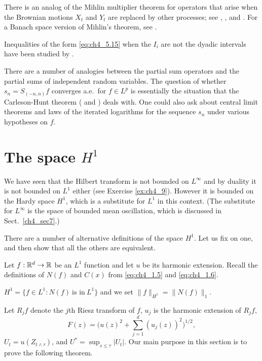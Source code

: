 There is an analog of the Mihlin multiplier theorem for operators that arise when the Brownian motions $X_t$ and $Y_t$ are replaced by other processes; see \cite{Stein1970b}, \cite{Meyer1976,Meyer1981}, and \cite{Varopoulos1980a}. For a Banach space version of Mihlin's theorem, see \cite{McConnell1984}.

Inequalities of the form \eqref{eq:ch4_5.15} when the $I_i$ are not the dyadic intervals have been studied by \cite{RubioDeFrancia1985}.

There are a number of analogies between the partial sum operators and the partial sums of independent random variables. The question of whether $s_n = S_{(-n,n)}f$ converges a.e.\ for $f \in L^p$ is essentially the situation that the Carleson-Hunt theorem (\cite{Carleson1966} and \cite{Hunt1968}) deals with. One could also ask about central limit theorems and laws of the iterated logarithms for the sequence $s_n$ under various hypotheses on $f$.

\section{The space \texorpdfstring{$H^1$}{H¹}}\label{ch4_sec6}


We have seen that the Hilbert transform is not bounded on $L^\infty$ and by duality it is not bounded on $L^1$ either (see Exercise \ref{ex:ch4_9}). However it is bounded on the Hardy space $H^1$, which is a substitute for $L^1$ in this context. (The substitute for $L^\infty$ is the space of bounded mean oscillation, which is discussed in Sect.\ \ref{ch4_sec7}.)

There are a number of alternative definitions of the space $H^1$. Let us fix on one, and then show that all the others are equivalent.

Let $f : \mathbb{R}^d \to \mathbb{R}$ be an $L^1$ function and let $u$ be its harmonic extension. Recall the definitions of $N(f)$ and $C(x)$ from \eqref{eq:ch4_1.5} and \eqref{eq:ch4_1.6}.

\begin{definition}\label{def:ch4_6.1}
    $H^1 = \{f \in L^1 : N(f)~\text{is in}~L^1\}$ and we set $\|f\|_{H^1} = \|N(f)\|_1$.
\end{definition}

Let $R_jf$ denote the $j$th Riesz transform of $f$, $u_j$ is the harmonic extension of $R_jf$,
\begin{equation}\label{eq:ch4_6.1}
    F(z) = \Big(u(z)^2 + \sum_{j=1}^d(u_j(z))^2\Big)^{1/2},
\end{equation}
$U_t = u(Z_{t\wedge\tau})$, and $U^* = \sup_{s\leq\tau} |U_t|$. Our main purpose in this section is to prove the following theorem.

